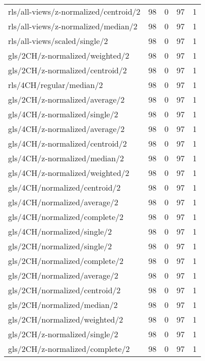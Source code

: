 \begin{longtable}{lrrrr}
    rls/all-views/z-normalized/centroid/2     & 98 &  0 & 97 &  1 \\
    rls/all-views/z-normalized/median/2       & 98 &  0 & 97 &  1 \\
    rls/all-views/scaled/single/2             & 98 &  0 & 97 &  1 \\
    gls/2CH/z-normalized/weighted/2           & 98 &  0 & 97 &  1 \\
    gls/2CH/z-normalized/centroid/2           & 98 &  0 & 97 &  1 \\
    rls/4CH/regular/median/2                  & 98 &  0 & 97 &  1 \\
    gls/2CH/z-normalized/average/2            & 98 &  0 & 97 &  1 \\
    gls/4CH/z-normalized/single/2             & 98 &  0 & 97 &  1 \\
    gls/4CH/z-normalized/average/2            & 98 &  0 & 97 &  1 \\
    gls/4CH/z-normalized/centroid/2           & 98 &  0 & 97 &  1 \\
    gls/4CH/z-normalized/median/2             & 98 &  0 & 97 &  1 \\
    gls/4CH/z-normalized/weighted/2           & 98 &  0 & 97 &  1 \\
    gls/4CH/normalized/centroid/2             & 98 &  0 & 97 &  1 \\
    gls/4CH/normalized/average/2              & 98 &  0 & 97 &  1 \\
    gls/4CH/normalized/complete/2             & 98 &  0 & 97 &  1 \\
    gls/4CH/normalized/single/2               & 98 &  0 & 97 &  1 \\
    gls/2CH/normalized/single/2               & 98 &  0 & 97 &  1 \\
    gls/2CH/normalized/complete/2             & 98 &  0 & 97 &  1 \\
    gls/2CH/normalized/average/2              & 98 &  0 & 97 &  1 \\
    gls/2CH/normalized/centroid/2             & 98 &  0 & 97 &  1 \\
    gls/2CH/normalized/median/2               & 98 &  0 & 97 &  1 \\
    gls/2CH/normalized/weighted/2             & 98 &  0 & 97 &  1 \\
    gls/2CH/z-normalized/single/2             & 98 &  0 & 97 &  1 \\
    gls/2CH/z-normalized/complete/2           & 98 &  0 & 97 &  1 \\

\end{longtable}
